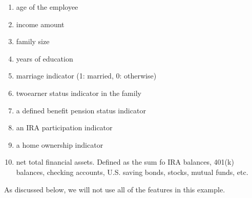 \documentclass[letterpaper,10pt,english]{jupyterBook}
\begin{document}
\begin{enumerate}
%
\item {} 
\sphinxAtStartPar
{} age of the employee

\item {} 
\sphinxAtStartPar
{} income amount

\item {} 
\sphinxAtStartPar
{} family size

\item {} 
\sphinxAtStartPar
{} years of education

\item {} 
\sphinxAtStartPar
{} marriage indicator (1: married, 0: otherwise)

\item {} 
\sphinxAtStartPar
{} two\sphinxhyphen{}earner status indicator in the family

\item {} 
\sphinxAtStartPar
{} a defined benefit pension status indicator

\item {} 
\sphinxAtStartPar
{} an IRA participation indicator

\item {} 
\sphinxAtStartPar
{} a home ownership indicator

\item {} 
\sphinxAtStartPar
{} net total financial assets. Defined as the sum fo IRA balances, 401(k) balances, checking accounts, U.S. saving bonds, stocks, mutual funds, etc.

\end{enumerate}

\sphinxAtStartPar
As discussed below, we will not use all of the features in this example.
\end{document}

